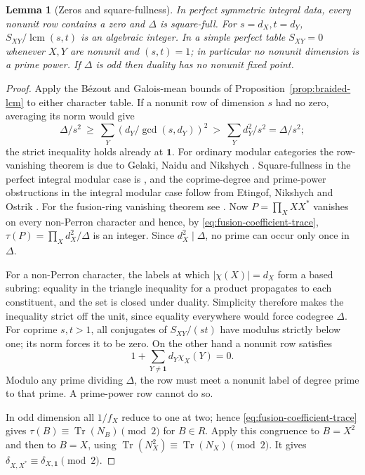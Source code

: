 \documentclass[11pt,a4paper]{article}
\numberwithin{equation}{section}
\newtheorem{lemma}[theorem]{Lemma}
\theoremstyle{remark}
\newcommand{\one}{\mathbf1}
\newcommand{\Tr}{\operatorname{Tr}}
\newcommand{\lcm}{\operatorname{lcm}}
\begin{document}
\begin{lemma}[Zeros and square-fullness]\label{fam:M:2.4}\label{lem:tables}\label{lem:galois-row-bound}\label{lem:perfect-data-squarefull}\label{lem:strict-eigenvalues}\label{lem:odd-codegrees-duality}
In perfect symmetric integral data, every nonunit row contains a zero and $\Delta$ is square-full. For $s=d_X,t=d_Y$, $S_{XY}/\lcm(s,t)$ is an algebraic integer. In a simple perfect table $S_{XY}=0$ whenever $X,Y$ are nonunit and $(s,t)=1$; in particular no nonunit dimension is a prime power.
If $\Delta$ is odd then duality has no nonunit fixed point.
\end{lemma}
\begin{proof}
Apply the B\'ezout and Galois-mean bounds of Proposition~\ref{prop:braided-lcm} to either character table. If a nonunit row of dimension $s$ had no zero, averaging its norm would give
\[
 \Delta/s^2\ \ge\ \sum_Y (d_Y/\gcd(s,d_Y))^2
 \ >\ \sum_Y d_Y^2/s^2=\Delta/s^2;
\]
the strict inequality holds already at $\one$. For ordinary modular categories the row-vanishing theorem is due to
Gelaki, Naidu and Nikshych \cite[Theorem~6.1]{GNNcenters}.
Square-fullness in the perfect integral modular case is
\cite[Corollary~10.10]{BP}, and the coprime-degree and prime-power
obstructions in the integral modular case follow from
Etingof, Nikshych and Ostrik \cite[Lemma~7.1 and Corollary~7.2]{ENOsolvable}. For the fusion-ring vanishing theorem see \cite[Theorem~1.2]{BP}. Now $P=\prod_X XX^*$ vanishes on every non-Perron character and hence, by \eqref{eq:fusion-coefficient-trace}, $\tau(P)=\prod_X d_X^2/\Delta$ is an integer. Since $d_X^2\mid\Delta$, no prime can occur only once in $\Delta$.

For a non-Perron character, the labels at which $|\chi(X)|=d_X$ form a based subring: equality in the triangle inequality for a product propagates to each constituent, and the set is closed under duality. Simplicity therefore makes the inequality strict off the unit, since equality everywhere would force codegree $\Delta$. For coprime $s,t>1$, all conjugates of $S_{XY}/(st)$ have modulus strictly below one; its norm forces it to be zero. On the other hand a nonunit row satisfies
\begin{equation}\label{eq:reduced-unit-orthogonality}
 1+\sum_{Y\ne\one}d_Y\chi_X(Y)=0.
\end{equation}
Modulo any prime dividing $\Delta$, the row must meet a nonunit label of degree prime to that prime. A prime-power row cannot do so.

In odd dimension all $1/f_X$ reduce to one at two; hence \eqref{eq:fusion-coefficient-trace} gives $\tau(B)\equiv\Tr(N_B)\pmod2$ for $B\in R$. Apply this congruence to $B=X^2$ and then to $B=X$, using $\Tr(N_X^2)\equiv\Tr(N_X)\pmod2$. It gives $\delta_{X,X^*}\equiv\delta_{X,\one}\pmod2$.
\end{proof}
\end{document}

